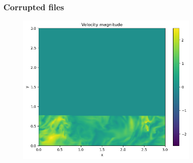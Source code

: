 \documentclass{beamer}
\begin{document}
\begin{frame}
\frametitle{Corrupted files}

\begin{figure}
	\centering
	\includegraphics[width=0.8\textwidth]{fig/corrupt_slice.png}
	\caption{}
\end{figure}

\end{frame}
\end{document}
